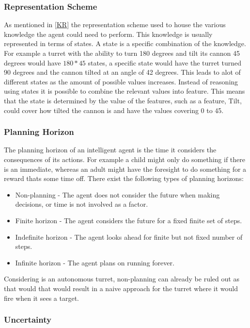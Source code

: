 \subsubsection{Representation Scheme}
As mentioned in \autoref{KR} the representation scheme used to house the various
knowledge the agent could need to perform. This knowledge is usually
represented in terms of states. A state is a specific combination of
the knowledge. For example a turret with the ability to turn 180 degrees and
tilt its cannon 45 degrees would have $180 * 45$ states, a specific state
would have the turret turned 90 degrees and the cannon tilted at an angle of 42
degrees. This leads to alot of different states as the amount of possible values
increases. Instead of reasoning using states it is possible to combine the
relevant values into feature. This means that the state is determined by the
value of the features, such as a feature, Tilt, could cover how tilted the
cannon is and have the values covering 0 to 45.

\subsubsection{Planning Horizon}
The planning horizon of an intelligent agent is the time it considers the
consequences of its actions. For example a child might only do something if
there is an immediate, whereas an adult might have the foresight to do something
for a reward thats some time off. There exist the following types of planning
horizons:
\begin{itemize}
	\item Non-planning - The agent does not consider the future when making
	decisions, or time is not involved as a factor.
	\item Finite horizon - The agent considers the future for a fixed finite set
	of steps. 
	\item Indefinite horizon - The agent looks ahead for finite but not fixed
	number of steps.
	\item Infinite horizon - The agent plans on running forever.	
\end{itemize}

Considering \name is an autonomous turret, non-planning can already be ruled
out as that would that would result in a naive approach for the turret where it
would fire when it sees a target.

\subsubsection{Uncertainty}

